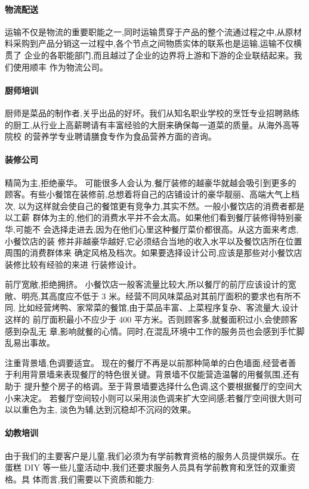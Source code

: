 \paragraph{物流配送}
运输不仅是物流的重要职能之一,同时运输贯穿于产品的整个流通过程之中,从原材
料采购到产品分销这一过程中,各个节点之间物质实体的联系也是运输,运输不仅横贯了
企业的各职能部门,而且越过了企业的边界将上游和下游的企业联结起来。我们使用顺丰
作为物流公司。

\paragraph{厨师培训}
厨师是菜品的制作者,关乎出品的好坏。我们从知名职业学校的烹饪专业招聘熟练
的厨工,从行业上高薪聘请有丰富经验的大厨来确保每一道菜的质量。从海外高等院校
的营养学专业聘请膳食专作为食品营养方面的咨询。

\paragraph{装修公司}

精简为主,拒绝豪华。
可能很多人会认为,餐厅装修的越豪华就越会吸引到更多的
顾客。有些小餐馆在装修前,总想着将自己的店铺设计的豪华靓丽、高端大气上档次,
以为这样就会使自己的餐馆更有竞争力,其实不然。一般小餐饮店的消费者都是以工薪
群体为主的,他们的消费水平并不会太高。如果他们看到餐厅装修得特别豪华,可能不
会选择走进去,因为在他们心里这种餐厅菜价都很高。从这方面来考虑,小餐饮店的装
修并非越豪华越好,它必须结合当地的收入水平以及餐饮店所在位置周围的消费群体来
确定风格及档次。如果要选择设计公司,应该是那些对小餐饮店装修比较有经验的来进
行装修设计。

前厅宽敞,拒绝拥挤。
小餐饮店一般客流量比较大,所以餐厅的前厅应该设计的宽
敞、明亮,其高度应不低于 3 米。经营不同风味菜品对其前厅面积的要求也有所不同,
比如经营烤鸭、家常菜的餐馆,由于菜品丰富、上菜程序复杂、客流量大,设计这样的
前厅面积最小不应少于 400 平方米。否则顾客多,就餐面积过小,会使顾客感到杂乱无
章,影响就餐的心情。同时,在混乱环境中工作的服务员也会感到手忙脚乱易出事故。

注重背景墙,色调要适宜。
现在的餐厅不再是以前那种简单的白色墙面,经营者善
于利用背景墙来表现餐厅的特色很关键。背景墙不仅能营造温馨的用餐氛围,还有助于
提升整个房子的格调。至于背景墙要选择什么色调,这个要根据餐厅的空间大小来决定。
若餐厅空间较小则可以采用淡色调来扩大空间感;若餐厅空间很大则可以以重色为主,
淡色为辅,达到沉稳却不沉闷的效果。

\paragraph{幼教培训}
由于我们的主要客户是儿童,我们必须为有学前教育资格的服务人员提供娱乐。在
蛋糕 DIY 等一些儿童活动中,我们还要求服务人员具有学前教育和烹饪的双重资格。具
体而言,我们需要以下资质和能力:


